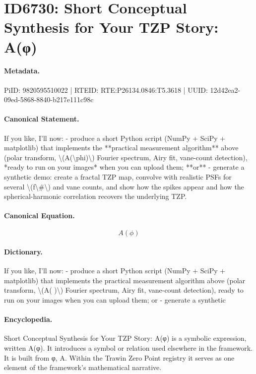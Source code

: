 \section*{ID6730: Short Conceptual Synthesis for Your TZP Story: A(φ)}
\paragraph{Metadata.}
PiID: 9820595510022 | RTEID: RTE:P26134.0846:T5.3618 | UUID: 12d42ea2-09ed-5868-8840-b217e111c98c

\paragraph{Canonical Statement.}
If you like, I’ll now: - produce a short Python script (NumPy + SciPy + matplotlib) that implements the **practical measurement algorithm** above (polar transform, \textbackslash{}(A(\textbackslash{}phi)\textbackslash{}) Fourier spectrum, Airy fit, vane-count detection), *ready to run on your images* when you can upload them; **or** - generate a synthetic demo: create a fractal TZP map, convolve with realistic PSFs for several \textbackslash{}(f\textbackslash{}\#\textbackslash{}) and vane counts, and show how the spikes appear and how the spherical-harmonic correlation recovers the underlying TZP.

\paragraph{Canonical Equation.}
\[
A(\phi)
\]

\paragraph{Dictionary.}
If you like, I’ll now: - produce a short Python script (NumPy + SciPy + matplotlib) that implements the practical measurement algorithm above (polar transform, \textbackslash{}(A( )\textbackslash{}) Fourier spectrum, Airy fit, vane-count detection), ready to run on your images when you can upload them; or - generate a synthetic

\paragraph{Encyclopedia.}
Short Conceptual Synthesis for Your TZP Story: A(φ) is a symbolic expression, written A(φ). It introduces a symbol or relation used elsewhere in the framework. It is built from φ, A. Within the Trawin Zero Point registry it serves as one element of the framework's mathematical narrative.
